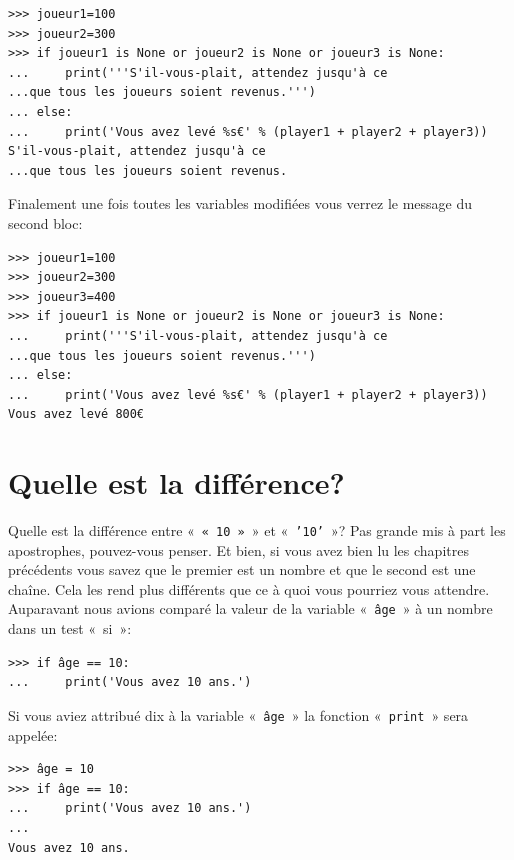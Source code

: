 \begin{Verbatim}[frame=single,rulecolor=\color{green}, label=à taper avec attention]
>>> joueur1=100
>>> joueur2=300
>>> if joueur1 is None or joueur2 is None or joueur3 is None:
...     print('''S'il-vous-plait, attendez jusqu'à ce 
...que tous les joueurs soient revenus.''')
... else:
...     print('Vous avez levé %s€' % (player1 + player2 + player3))
S'il-vous-plait, attendez jusqu'à ce 
...que tous les joueurs soient revenus.
\end{Verbatim}

Finalement une fois toutes les variables modifiées vous verrez le message du second bloc:

\begin{Verbatim}[frame=single,rulecolor=\color{green}, label=à taper avec attention]
>>> joueur1=100
>>> joueur2=300
>>> joueur3=400
>>> if joueur1 is None or joueur2 is None or joueur3 is None:
...     print('''S'il-vous-plait, attendez jusqu'à ce 
...que tous les joueurs soient revenus.''')
... else:
...     print('Vous avez levé %s€' % (player1 + player2 + player3))
Vous avez levé 800€
\end{Verbatim}

\section{Quelle est la différence?\label{sec:dif}}

Quelle est la différence entre «~\texttt{«~10~»}~» et «~\texttt{'10'}~»?
Pas grande mis à part les apostrophes, pouvez-vous penser. Et bien, si vous avez bien lu les chapitres précédents vous savez que le premier est un nombre et que le second est une chaîne. Cela les rend plus différents que ce à quoi vous pourriez vous attendre. Auparavant nous avions comparé la valeur de la variable «~\texttt{âge}~» à un nombre dans un test «~si~»:

\begin{Verbatim}[frame=single,rulecolor=\color{green}, label=à taper avec attention]
>>> if âge == 10:
...     print('Vous avez 10 ans.')
\end{Verbatim}

Si vous aviez attribué dix à la variable «~\texttt{âge}~»  la fonction «~\texttt{print}~»  sera appelée:

\begin{Verbatim}[frame=single,rulecolor=\color{green}, label=à taper avec attention]
>>> âge = 10
>>> if âge == 10:
...     print('Vous avez 10 ans.')
...
Vous avez 10 ans.
\end{Verbatim}

